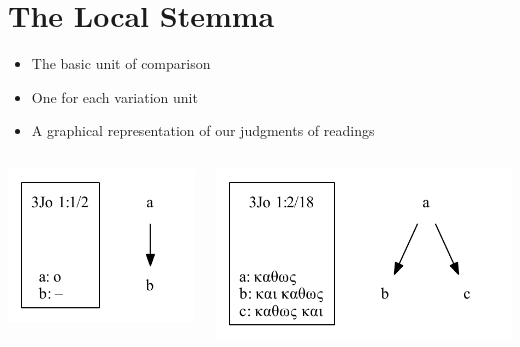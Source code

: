 \documentclass[10pt]{beamer}
\begin{document}
	\section*{The Local Stemma}
	\begin{frame}
		\begin{itemize}
			\item The basic unit of comparison
			\item One for each variation unit
			\item A graphical representation of our judgments of readings
		\end{itemize}
		\begin{columns}
			\begin{column}{0.45\textwidth}
				\begin{center}
					\includegraphics[scale=0.5]{../img/B25K1V1U2-local-stemma.pdf}
				\end{center}
			\end{column}
			\begin{column}{0.45\textwidth}
				\begin{center}
					\includegraphics[scale=0.5]{../img/B25K1V2U18-local-stemma.pdf}
				\end{center}
			\end{column}
		\end{columns}
	\end{frame}
\end{document}
